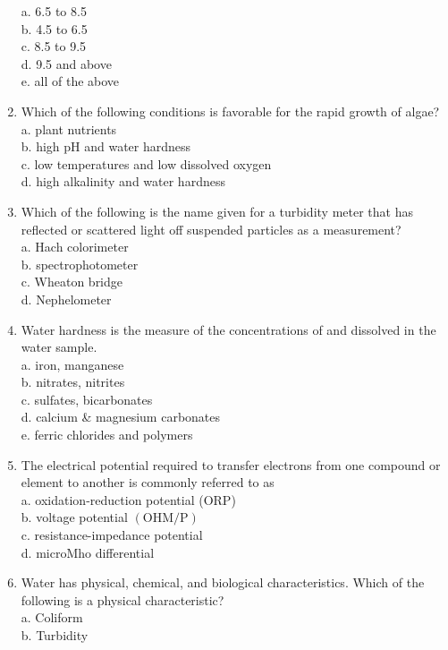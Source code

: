 \begin{enumerate}[1.]
a. 6.5 to 8.5\\
b. 4.5 to 6.5\\
c. 8.5 to 9.5\\
d. 9.5 and above\\
e. all of the above\\
\item Which of the following conditions is favorable for the rapid growth of algae?\\
a. plant nutrients\\
b. high $\mathrm{pH}$ and water hardness\\
c. low temperatures and low dissolved oxygen\\
d. high alkalinity and water hardness\\
\item Which of the following is the name given for a turbidity meter that has reflected or scattered light off suspended particles as a measurement?\\
a. Hach colorimeter\\
b. spectrophotometer\\
c. Wheaton bridge\\
d. Nephelometer\\
\item Water hardness is the measure of the concentrations of and dissolved in the water sample.\\
a. iron, manganese\\
b. nitrates, nitrites\\
c. sulfates, bicarbonates\\
d. calcium \& magnesium carbonates\\
e. ferric chlorides and polymers\\
\item The electrical potential required to transfer electrons from one compound or element to another is commonly referred to as\\
a. oxidation-reduction potential (ORP)\\
b. voltage potential $(\mathrm{OHM} / \mathrm{P})$\\
c. resistance-impedance potential\\
d. microMho differential\\
\item Water has physical, chemical, and biological characteristics. Which of the following is a physical characteristic?\\
a. Coliform\\
b. Turbidity\\ 

\end{enumerate}
